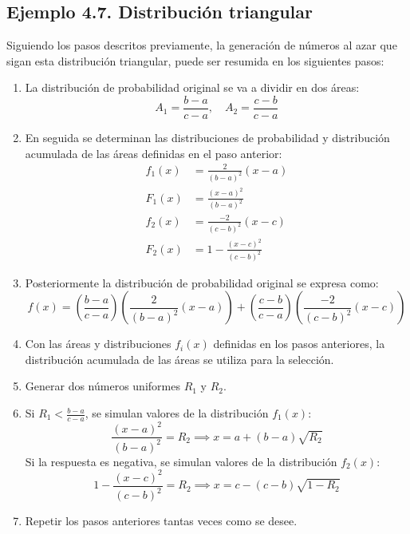 \documentclass[11pt,letterpaper]{report}
\begin{document}
\subsection*{Ejemplo 4.7. Distribución triangular}
Siguiendo los pasos descritos previamente, la generación de números al azar que sigan esta distribución triangular, puede ser resumida en los siguientes pasos:

\begin{enumerate}
    \item La distribución de probabilidad original se va a dividir en dos áreas:
    \[
    A_1 = \frac{b - a}{c - a}, \quad A_2 = \frac{c - b}{c - a}
    \]
    \item En seguida se determinan las distribuciones de probabilidad y distribución acumulada de las áreas definidas en el paso anterior:
    \begin{align}
    f_1(x) &= \frac{2}{(b - a)^2}(x - a) \\
    F_1(x) &= \frac{(x - a)^2}{(b - a)^2} \\
    f_2(x) &= \frac{-2}{(c - b)^2}(x - c) \\
    F_2(x) &= 1 - \frac{(x - c)^2}{(c - b)^2}
    \end{align}
    \item Posteriormente la distribución de probabilidad original se expresa como:
    \begin{equation}
    f(x) = \left(\frac{b - a}{c - a}\right) \left(\frac{2}{(b - a)^2}(x - a)\right) + \left(\frac{c - b}{c - a}\right) \left(\frac{-2}{(c - b)^2}(x - c)\right)
    \end{equation}
    \item Con las áreas y distribuciones $f_i(x)$ definidas en los pasos anteriores, la distribución acumulada de las áreas se utiliza para la selección.
    \item Generar dos números uniformes $R_1$ y $R_2$.
    \item Si $R_1 < \frac{b - a}{c - a}$, se simulan valores de la distribución $f_1(x)$:
    \[
    \frac{(x - a)^2}{(b - a)^2} = R_2 \implies x = a + (b - a)\sqrt{R_2} \tag{4.21}
    \]
    Si la respuesta es negativa, se simulan valores de la distribución $f_2(x)$:
    \[
    1 - \frac{(x - c)^2}{(c - b)^2} = R_2 \implies x = c - (c - b)\sqrt{1 - R_2} \tag{4.22}
    \]
    \item Repetir los pasos anteriores tantas veces como se desee.
\end{enumerate}

\end{document}
